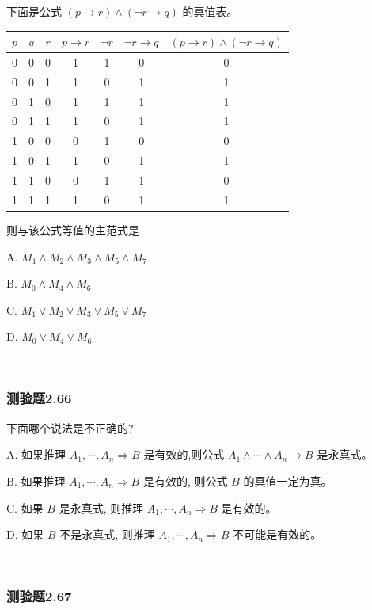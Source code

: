 \documentclass[UTF8, heading=true]{ctexart}
\begin{document}
下面是公式 $(p \rightarrow r) \wedge(\neg r \rightarrow q)$ 的真值表。
\begin{table}[H]
  \centering
\begin{tabular}{c|c|c|c|c|c|c}
\hline$p$ & $q$ & $r$ & $p \rightarrow r$ & $\neg r$ & $\neg r \rightarrow q$ & $(p \rightarrow r) \wedge(\neg r \rightarrow q)$ \\
\hline 0 & 0 & 0 & 1 & 1 & 0 & 0 \\
\hline 0 & 0 & 1 & 1 & 0 & 1 & 1 \\
\hline 0 & 1 & 0 & 1 & 1 & 1 & 1 \\
\hline 0 & 1 & 1 & 1 & 0 & 1 & 1 \\
\hline 1 & 0 & 0 & 0 & 1 & 0 & 0 \\
\hline 1 & 0 & 1 & 1 & 0 & 1 & 1 \\
\hline 1 & 1 & 0 & 0 & 1 & 1 & 0 \\
\hline 1 & 1 & 1 & 1 & 0 & 1 & 1 \\
\hline
\end{tabular}
\end{table}

则与该公式等值的主范式是

A. $
M_1 \wedge M_2 \wedge M_3 \wedge M_5 \wedge M_7
$

B. $
M_0 \wedge M_4 \wedge M_6
$

C. $
M_1 \vee M_2 \vee M_3 \vee M_5 \vee M_7
$

D. $
M_0 \vee M_4 \vee M_6
$

\textcolor{white}{答案：B}

\subsubsection{测验题2.66}

下面哪个说法是不正确的?

A. 如果推理 $A_1, \cdots, A_n \Longrightarrow B$ 是有效的,则公式 $A_1 \wedge \cdots \wedge A_n \rightarrow B$ 是永真式。

B. 如果推理 $A_1, \cdots, A_n \Longrightarrow B$ 是有效的, 则公式 $B$ 的真值一定为真。

C. 如果 $B$ 是永真式, 则推理 $A_1, \cdots, A_n \Longrightarrow B$ 是有效的。

D. 如果 $B$ 不是永真式, 则推理 $A_1, \cdots, A_n \Longrightarrow B$ 不可能是有效的。


\textcolor{white}{答案：BD}

\subsubsection{测验题2.67}
\end{document}
